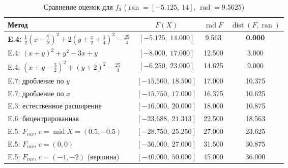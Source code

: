\documentclass[12pt,a4paper]{article}
\newcommand{\ran}{\operatorname{ran}}
\newcommand{\rad}{\operatorname{rad}}
\newcommand{\Mid}{\operatorname{mid}}
\newcommand{\dist}{\operatorname{dist}}
\begin{document}
\begin{table}[H]
\centering
\begin{tabular}{|l|c|c|c|}
\hline
Метод & $F(X)$ & $\rad F$ & $\dist(F,\ran)$ \\
\hline
\textbf{E.4:} $\frac12(x-\frac72)^2+2(y+\frac x2+\frac14)^2-\frac{25}4$ & $[-5.125,\ 14.000]$ & 9.563 & \textbf{0.000} \\
E.4: $(x+y)^2+y^2-3x+y$ & $[-8.000,\ 17.000]$ & 12.500 & 3.000 \\
E.4: $(x+y-\frac32)^2+(y+2)^2-\frac{25}4$ & $[-6.250,\ 23.000]$ & 14.625 & 9.000 \\
E.7: дробление по $y$ & $[-15.500,\ 18.500]$ & 17.000 & 10.375 \\
E.7: дробление по $x$ & $[-15.750,\ 17.000]$ & 16.375 & 10.625 \\
E.3: естественное расширение & $[-16.000,\ 20.000]$ & 18.000 & 10.875 \\
E.6: бицентрированная & $[-23.688,\ 21.313]$ & 22.500 & 18.563 \\
E.5: $F_{mv}$, $c=\Mid X=(0.5,-0.5)$ & $[-28.750,\ 25.250]$ & 27.000 & 23.625 \\
E.5: $F_{mv}$, $c=(0,0)$ & $[-36.000,\ 27.000]$ & 31.500 & 30.875 \\
E.5: $F_{mv}$, $c=(-1,-2)$ (вершина) & $[-40.000,\ 50.000]$ & 45.000 & 36.000 \\
\hline
\end{tabular}
\caption{Сравнение оценок для $f_3$ ($\ran=[-5.125,\ 14]$, $\rad=9.5625$)}
\label{tab:f3}
\end{table}
\end{document}
